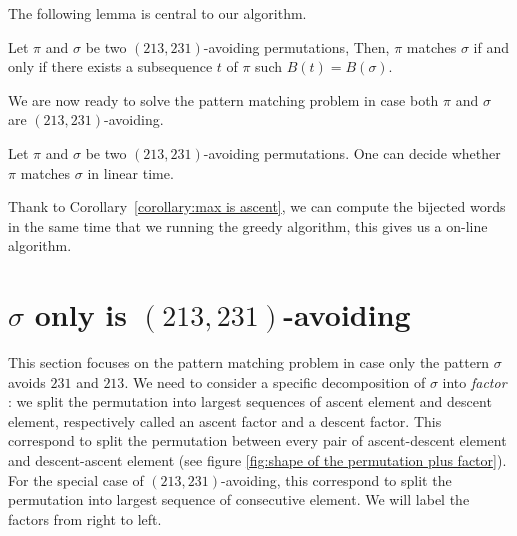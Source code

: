 \documentclass[a4paper]{llncs}
\newcommand{\bijection}{B}
\begin{document}
The following lemma is central to our algorithm.

\begin{lemma}
\label{lemma:MatchStripeToPermutation}
Let $\pi$ and $\sigma$ be two $(213,231)$-avoiding permutations,
Then, $\pi$ matches $\sigma$ if and only if 
there exists a subsequence $t$ of $\pi$ such $\bijection(t)=\bijection(\sigma)$.
\end{lemma}

We are now ready to solve the pattern matching problem in case
both $\pi$ and $\sigma$ are $(213, 231)$-avoiding.

\begin{proposition}
	\label{Proposition:both permutations are avoiding}
	Let $\pi$ and $\sigma$ be two $(213,231)$-avoiding permutations.
	One can decide whether $\pi$ matches $\sigma$ in linear time.
\end{proposition}

Thank to Corollary~\ref{corollary:max is ascent},
we can compute the bijected words in the same time that we running the greedy algorithm, this gives us a on-line algorithm.



\section{$\sigma$ only is $(213,231)$-avoiding}
\label{section:sigma only avoid 231 and 213}

This section focuses on the pattern matching problem
in case only the pattern $\sigma$ avoids $231$ and $213$.
We need to consider a specific decomposition of $\sigma$ into \textit{factor} :
we split the permutation into largest sequences of ascent element and descent element, respectively called an ascent factor and a descent factor.
This correspond to split the permutation between every pair of ascent-descent element and descent-ascent element (see figure \ref{fig:shape of the permutation plus factor}).
For the special case of $(213,231)$-avoiding, this correspond to split the permutation into largest sequence of consecutive element.
We will label the factors from right to left.
\end{document}
